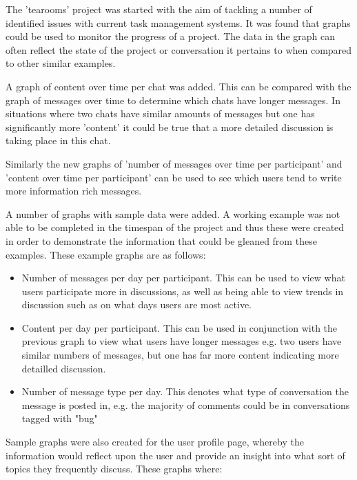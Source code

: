 \documentclass{l4proj}
\begin{document}
The 'tearooms' project was started with the aim of tackling a number of identified issues with current task management systems. It was found that graphs could be used to monitor the progress of a project. The data in the graph can often reflect the state of the project or conversation it pertains to when compared to other similar examples.

A graph of content over time per chat was added.  This can be compared with the graph of messages over time to determine which chats have longer messages.  In situations where two chats have similar amounts of messages but one has significantly more 'content' it could be true that a more detailed discussion is taking place in this chat.

Similarly the new graphs of 'number of messages over time per participant' and 'content over time per participant' can be used to see which users tend to write more information rich messages.

A number of graphs with sample data were added.  A working example was not able to be completed in the timespan of the project and thus these were created in order to demonstrate the information that could be gleaned from these examples.  These example graphs are as follows:

\begin{itemize}
\item Number of messages per day per participant.  This can be used to view what users participate more in discussions, as well as being able to view trends in discussion such as on what days users are most active.
\item Content per day per participant.  This can be used in conjunction with the previous graph to view what users have longer messages e.g. two users have similar numbers of messages, but one has far more content indicating more detailled discussion.
\item Number of message type per day.  This denotes what type of conversation the message is posted in, e.g. the majority of comments could be in conversations tagged with "bug"
\end{itemize}

Sample graphs were also created for the user profile page, whereby the information would reflect upon the user and provide an insight into what sort of topics they frequently discuss. These graphs where:
\end{document}
